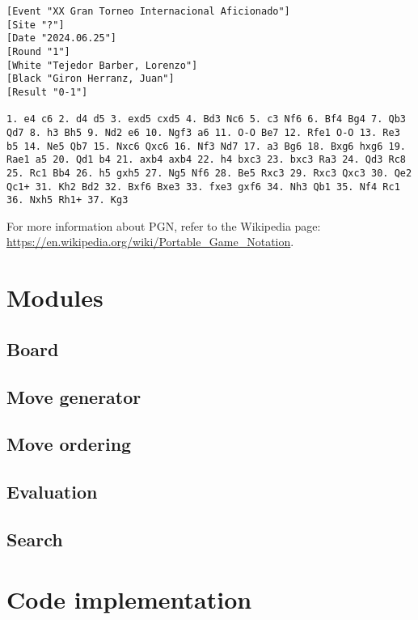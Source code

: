 \begin{lstlisting}[basicstyle=\ttfamily\small, breaklines=true, frame=single, caption={Example of a PGN file}, label={lst:pgn-example}]
[Event "XX Gran Torneo Internacional Aficionado"]
[Site "?"]
[Date "2024.06.25"]
[Round "1"]
[White "Tejedor Barber, Lorenzo"]
[Black "Giron Herranz, Juan"]
[Result "0-1"]

1. e4 c6 2. d4 d5 3. exd5 cxd5 4. Bd3 Nc6 5. c3 Nf6 6. Bf4 Bg4 7. Qb3 Qd7 8. h3 Bh5 9. Nd2 e6 10. Ngf3 a6 11. O-O Be7 12. Rfe1 O-O 13. Re3 b5 14. Ne5 Qb7 15. Nxc6 Qxc6 16. Nf3 Nd7 17. a3 Bg6 18. Bxg6 hxg6 19. Rae1 a5 20. Qd1 b4 21. axb4 axb4 22. h4 bxc3 23. bxc3 Ra3 24. Qd3 Rc8 25. Rc1 Bb4 26. h5 gxh5 27. Ng5 Nf6 28. Be5 Rxc3 29. Rxc3 Qxc3 30. Qe2 Qc1+ 31. Kh2 Bd2 32. Bxf6 Bxe3 33. fxe3 gxf6 34. Nh3 Qb1 35. Nf4 Rc1 36. Nxh5 Rh1+ 37. Kg3
\end{lstlisting}

For more information about PGN, refer to the Wikipedia page: \url{https://en.wikipedia.org/wiki/Portable_Game_Notation}.

\section{Modules}
\label{sec:modules}

\subsection{Board}

\subsection{Move generator}

\subsection{Move ordering}

\subsection{Evaluation}

\subsection{Search}

\section{Code implementation}

